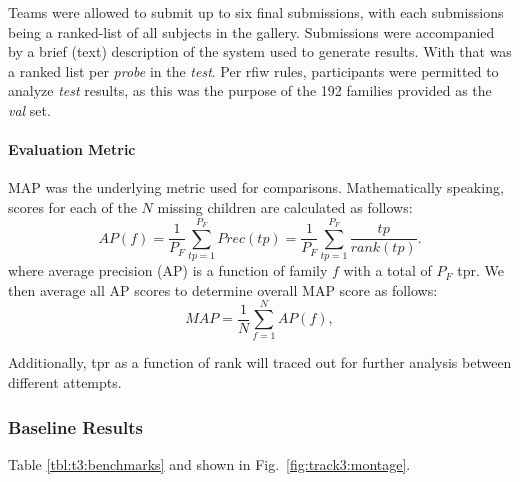 \documentclass[letterpaper, 10 pt, conference]{ieeeconf}  %
\begin{document}
Teams were allowed to submit up to six final submissions, with each submissions being a ranked-list of all subjects in the gallery. Submissions were accompanied by a brief (text) description of the system used to generate results. With that was a ranked list per \textit{probe} in the \textit{test}. Per \ac{rfiw} rules, participants were permitted to analyze \emph{test} results, as this was the purpose of the 192 families provided as the \emph{val} set.

\paragraph{Evaluation Metric} 
MAP was the underlying metric used for comparisons. Mathematically speaking, scores for each of the $N$ missing children are calculated as follows:
$$AP(f)=\frac{1}{P_F}\sum^{P_F}_{tp=1}Prec(tp)=\frac{1}{P_F}\sum^{P_F}_{tp=1}\frac{tp}{rank(tp)}.$$
where average precision (AP) is a function of family $f$ with a total of ${P_F}$ \ac{tpr}. We then average all AP scores to determine overall MAP score as follows:
$$MAP = \frac{1}{N}\sum^{N}_{f=1}AP(f),$$



Additionally, \ac{tpr} as a function of rank will traced out for further analysis between different attempts.




\subsubsection{Baseline Results}
Table \ref{tbl:t3:benchmarks} and shown in Fig.~\ref{fig:track3:montage}.
\end{document}
